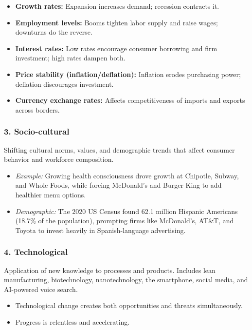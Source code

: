 \documentclass[11pt, letterpaper]{article}
\begin{document}
\begin{itemize}[leftmargin=*, label=--]
  \item \textbf{Growth rates:} Expansion increases demand; recession contracts it.
  \item \textbf{Employment levels:} Booms tighten labor supply and raise wages; downturns do the reverse.
  \item \textbf{Interest rates:} Low rates encourage consumer borrowing and firm investment; high rates dampen both.
  \item \textbf{Price stability (inflation/deflation):} Inflation erodes purchasing power; deflation discourages investment.
  \item \textbf{Currency exchange rates:} Affects competitiveness of imports and exports across borders.
\end{itemize}

\subsubsection{3. Socio-cultural}
Shifting cultural norms, values, and demographic trends that affect consumer behavior and workforce composition.

\begin{itemize}[leftmargin=*]
  \item \textit{Example:} Growing health consciousness drove growth at Chipotle, Subway, and Whole Foods, while forcing McDonald's and Burger King to add healthier menu options.
  \item \textit{Demographic:} The 2020 US Census found 62.1 million Hispanic Americans (18.7\% of the population), prompting firms like McDonald's, AT\&T, and Toyota to invest heavily in Spanish-language advertising.
\end{itemize}

\subsubsection{4. Technological}
Application of new knowledge to processes and products. Includes lean manufacturing, biotechnology, nanotechnology, the smartphone, social media, and AI-powered voice search.

\begin{itemize}[leftmargin=*]
  \item Technological change creates both opportunities and threats simultaneously.
  \item Progress is relentless and accelerating.
\end{itemize}
\end{document}
